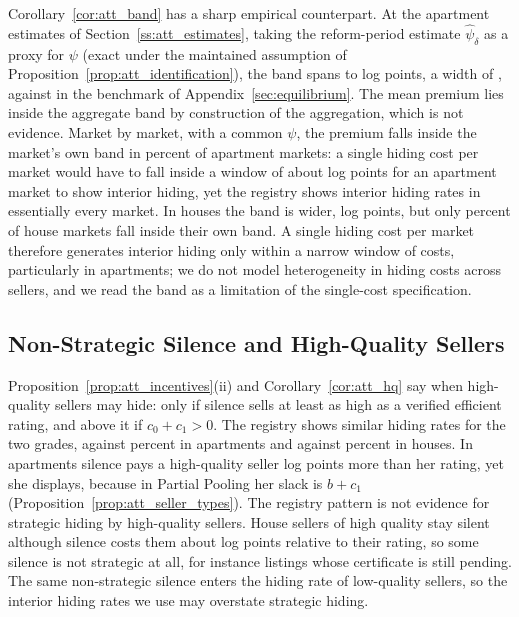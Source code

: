 Corollary~\ref{cor:att_band} has a sharp empirical counterpart. At the apartment estimates of Section~\ref{ss:att_estimates}, taking the reform-period estimate $\hat\psi_\delta$ as a proxy for $\psi$ (exact under the maintained assumption of Proposition~\ref{prop:att_identification}), the band spans \attBandLoApt{} to \attBandHiApt{} log points, a width of \attBandWidthApt{}, against \attBandWidthBaseApt{} in the benchmark of Appendix~\ref{sec:equilibrium}. The mean premium lies inside the aggregate band by construction of the aggregation, which is not evidence. Market by market, with a common $\psi$, the premium falls inside the market's own band in \attShareInBandApt{} percent of apartment markets: a single hiding cost per market would have to fall inside a window of about \attBandWidthApt{} log points for an apartment market to show interior hiding, yet the registry shows interior hiding rates in essentially every market. In houses the band is wider, \attBandWidthHouse{} log points, but only \attShareInBandHouse{} percent of house markets fall inside their own band. A single hiding cost per market therefore generates interior hiding only within a narrow window of costs, particularly in apartments; we do not model heterogeneity in hiding costs across sellers, and we read the band as a limitation of the single-cost specification.

\subsection*{Non-Strategic Silence and High-Quality Sellers}
\label{app:att_nonstrategic}

Proposition~\ref{prop:att_incentives}(ii) and Corollary~\ref{cor:att_hq} say when high-quality sellers may hide: only if silence sells at least as high as a verified efficient rating, and above it if $c_0+c_1>0$. The registry shows similar hiding rates for the two grades, \attSigmaOneApt{} against \attSigmaZeroApt{} percent in apartments and \attSigmaOneHouse{} against \attSigmaZeroHouse{} percent in houses. In apartments silence pays a high-quality seller \attExcessApt{} log points more than her rating, yet she displays, because in Partial Pooling her slack is $b+c_1$ (Proposition~\ref{prop:att_seller_types}). The registry pattern is not evidence for strategic hiding by high-quality sellers. House sellers of high quality stay silent although silence costs them about \attHighLossHouse{} log points relative to their rating, so some silence is not strategic at all, for instance listings whose certificate is still pending. The same non-strategic silence enters the hiding rate of low-quality sellers, so the interior hiding rates we use may overstate strategic hiding.

